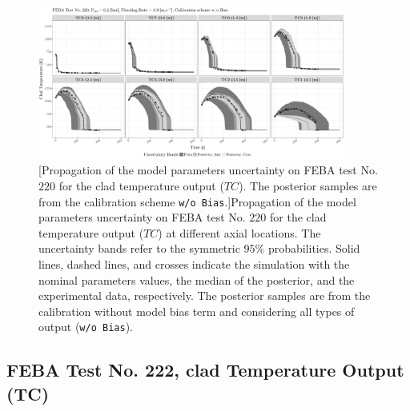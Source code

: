 \clearpage
\begin{figure}
	\centering
	\includegraphics[width=0.90\textwidth]{../figures/chapter5/figures/plotTraceUQPosteriorAllNoDiscNoBCTC220}
		[Propagation of the model parameters uncertainty on FEBA test No. $220$ for the clad temperature output ($TC$). The posterior samples are from the calibration scheme \texttt{w/o Bias}.]{Propagation of the model parameters uncertainty on FEBA test No. $220$ for the clad temperature output ($TC$) at different axial locations. The uncertainty bands refer to the symmetric $95\%$ probabilities. Solid lines, dashed lines, and crosses indicate the simulation with the nominal parameters values, the median of the posterior, and the experimental data, respectively. The posterior samples are from the calibration without model bias term and considering all types of output (\texttt{w/o Bias}).}
	\label{fig:ch5_plot_trace_uq_post_tc_220_nodisc}
\end{figure}
\clearpage

\subsection{FEBA Test No. 222, clad Temperature Output (TC)}\label{app:tbl_results_uq_post_tc_222}

